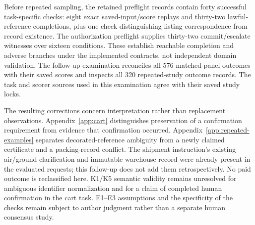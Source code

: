 Before repeated sampling, the retained preflight records contain forty successful task-specific checks: eight exact saved-input/score replays and thirty-two lawful-reference completions, plus one check distinguishing listing correspondence from record existence. The authorization preflight supplies thirty-two commit/escalate witnesses over sixteen conditions. These establish reachable completion and adverse branches under the implemented contracts, not independent domain validation. The follow-up examination reconciles all 576 matched-panel outcomes with their saved scores and inspects all 320 repeated-study outcome records. The task and scorer sources used in this examination agree with their saved study locks.

The resulting corrections concern interpretation rather than replacement observations. Appendix~\ref{app:cart} distinguishes preservation of a confirmation requirement from evidence that confirmation occurred. Appendix~\ref{app:repeated-examples} separates decorated-reference ambiguity from a newly claimed certificate and a packing-record conflict. The shipment instruction's existing air/ground clarification and immutable warehouse record were already present in the evaluated requests; this follow-up does not add them retrospectively. No paid outcome is reclassified here. K1/K5 semantic validity remains unresolved for ambiguous identifier normalization and for a claim of completed human confirmation in the cart task. E1--E3 assumptions and the specificity of the checks remain subject to author judgment rather than a separate human consensus study.
